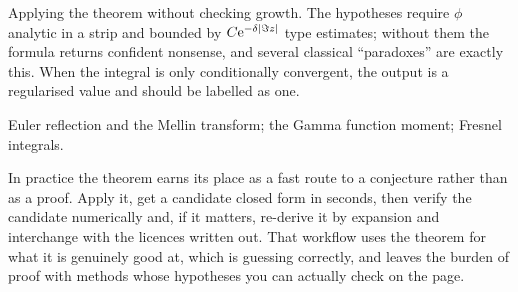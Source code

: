 \begin{trap}
Applying the theorem without checking growth. The hypotheses require $\phi$ analytic in a strip and bounded by $C\mathrm{e}^{-\delta\left\lvert \Im z\right\rvert}$ type estimates; without them the formula returns confident nonsense, and several classical ``paradoxes'' are exactly this. When the integral is only conditionally convergent, the output is a regularised value and should be labelled as one.
\end{trap}

\begin{seealsob}Euler reflection and the Mellin transform; the Gamma function moment; Fresnel integrals.\end{seealsob}

In practice the theorem earns its place as a fast route to a conjecture rather than as a proof. Apply it, get a candidate closed form in seconds, then verify the candidate numerically and, if it matters, re-derive it by expansion and interchange with the licences written out. That workflow uses the theorem for what it is genuinely good at, which is guessing correctly, and leaves the burden of proof with methods whose hypotheses you can actually check on the page.

\begin{center}
\end{center}

